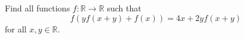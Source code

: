 Find all functions $f:\mathbb{R}\to\mathbb{R}$ such that \[f\left(yf\left(x+y\right)+f\left(x\right)\right)=4x+2yf\left(x+y\right)\] for all $x,y\in\mathbb{R}$.